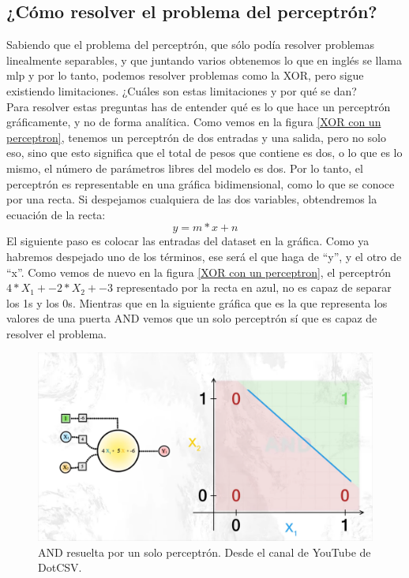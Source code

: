\subsection{¿Cómo resolver el problema del perceptrón?}
Sabiendo que el problema del perceptrón, que sólo podía resolver problemas linealmente separables, y que juntando varios obtenemos lo que en inglés se llama \gls{mlp} y por lo tanto, podemos resolver problemas como la XOR, pero sigue existiendo limitaciones. ¿Cuáles son estas limitaciones y por qué se dan?
\\
Para resolver estas preguntas has de entender qué es lo que hace un perceptrón gráficamente, y no de forma analítica. Como vemos en la figura \ref{XOR con un perceptron}, tenemos un perceptrón de dos entradas y una salida, pero no solo eso, sino que esto significa que el total de pesos que contiene es dos, o lo que es lo mismo, el número de parámetros libres del modelo es dos. Por lo tanto, el perceptrón es representable en una gráfica bidimensional, como lo que se conoce por una recta. Si despejamos cualquiera de las dos variables, obtendremos la ecuación de la recta:
\begin{equation}
	y = m*x + n
\end{equation}
El siguiente paso es colocar las entradas del dataset en la gráfica. Como ya habremos despejado uno de los términos, ese será el que haga de ``y'', y el otro de ``x''. Como vemos de nuevo en la figura \ref{XOR con un perceptron}, el perceptrón $4*X_1 + -2*X_2 + -3$ representado por la recta en azul, no es capaz de separar los 1s y los 0s. Mientras que en la siguiente gráfica que es la que representa los valores de una puerta AND vemos que un solo perceptrón sí que es capaz de resolver el problema.
\begin{figure}[h]
	\centering
	\includegraphics[width=15cm]{archivos/imagenes/perceptron-con-and.png}
	\caption{AND resuelta por un solo perceptrón. Desde el canal de YouTube de DotCSV.}
\end{figure}

